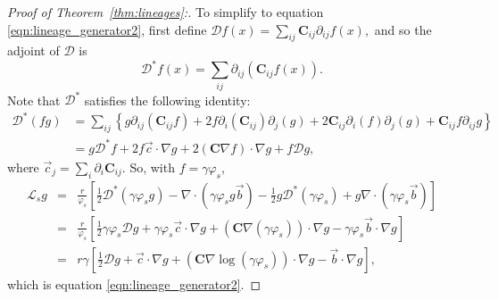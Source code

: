 \documentclass[EJP]{ejpecp} %
\newcommand{\grad}{\nabla}
\newcommand{\DD}{\mathcal{D}}  %
\newcommand{\meanq}{\vec b}    %
\newcommand{\covq}{\mathbf{C}}     %
\newcommand{\Lgen}{\mathcal{L}}    %
\begin{document}
\begin{proof}[Proof of Theorem~\ref{thm:lineages}:]
To simplify to equation \eqref{eqn:lineage_generator2},
first define
$
    \DD f(x) = \sum_{ij} \covq_{ij} \partial_{ij} f(x),
$
and so the adjoint of $\DD$ is
$$
    \DD^* f(x)
    =
    \sum_{ij} \partial_{ij} (\covq_{ij} f(x)) .
$$
Note that $\DD^*$ satisfies the following identity:
\begin{align*}
    \DD^*(fg)
    &=
    \sum_{ij} \left\{
        g \partial_{ij} (\covq_{ij} f)
        + 2 f \partial_{i} (\covq_{ij}) \partial_j(g)
        + 2 \covq_{ij} \partial_{i} (f) \partial_j(g)
        + \covq_{ij} f \partial_{ij} g
    \right\} \\
    &=
    g \DD^* f
    + 2 f \vec{c} \cdot \grad g
    + 2 (\covq \grad f) \cdot \grad g
    + f \DD g ,
\end{align*}
where $\vec{c}_j = \sum_i \partial_i \covq_{ij}$.
So, with $f = \gamma \varphi_s$,
\begin{eqnarray*}
\Lgen_s g
    &=&
    \frac{r}{\varphi_s} \left[
        \frac{1}{2} \DD^*(\gamma \varphi_s g) - \grad \cdot (\gamma \varphi_s g \meanq)
        - \frac{1}{2} g \DD^*(\gamma \varphi_s) + g \grad \cdot (\gamma \varphi_s \meanq)
    \right] \\
    &=&
    \frac{r}{\varphi_s} \left[
        \frac{1}{2} \gamma \varphi_s \DD g
        + \gamma \varphi_s \vec{c} \cdot \grad g
        + (\covq \grad (\gamma \varphi_s)) \cdot \grad g
        - \gamma \varphi_s \meanq \cdot \grad g
    \right] \\
    &=&
    r \gamma \left[
        \frac{1}{2} \DD g
        + \vec{c} \cdot \grad g
        + (\covq \grad \log(\gamma \varphi_s)) \cdot \grad g
        - \meanq \cdot \grad g
    \right] ,
\end{eqnarray*}
which is equation \eqref{eqn:lineage_generator2}.
\end{proof}
\end{document}
